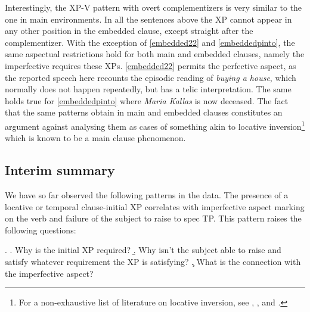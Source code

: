 \documentclass[11pt]{article}
\begin{document}
Interestingly, the XP-V pattern with overt complementizers is very similar to the one in main environments. In all the sentences above the XP cannot appear in any other position in the embedded clause, except straight after the complementizer. With the exception of \ref{embedded22} and \ref{embeddedpinto}, the same aspectual restrictions hold for both main and embedded clauses, namely the imperfective requires these XPs.  \ref{embedded22} permits the perfective aspect, as the reported speech here recounts the episodic reading of \textit{buying a house}, which normally does not happen repeatedly, but has a telic interpretation. The same holds true for \ref{embeddedpinto} where \textit{Maria Kallas} is now deceased. The fact that the same patterns obtain in main and embedded clauses constitutes an argument against analysing them as cases of something akin to locative inversion\footnote{ For a non-exhaustive list of literature on locative inversion, see \citet{bresnan:94}, \citet{bresnan-kanerva:89}, and \citet{levin-rappaport:95}.}   which is known to be a main clause phenomenon.

\subsection{Interim summary} \label{summary}

We have so far observed the following patterns in the data. The presence of a locative or temporal  clause-initial XP correlates with imperfective aspect marking on the verb and failure of the subject to raise to spec TP.  This pattern raises the following questions:

\ex.
\a. Why is the initial XP required?
\b. Why isn't the subject able to raise and satisfy whatever requirement the XP is satisfying?
\c.  What is the connection with the imperfective aspect?
\end{document}

